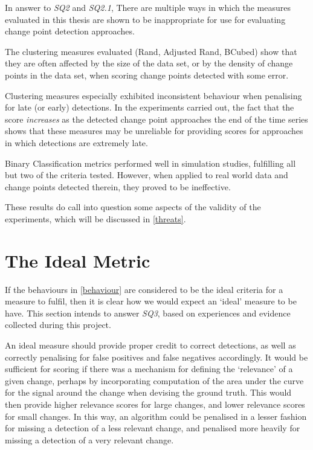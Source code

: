 \documentclass{uvamscse}	%
\begin{document}
In answer to \emph{SQ2} and \emph{SQ2.1},  There are multiple ways in which the measures evaluated in this thesis are shown to be inappropriate for use for evaluating change point detection approaches.

The clustering measures evaluated (Rand, Adjusted Rand, BCubed) show that they are often affected by the size of the data set, or by the density of change points in the data set, when scoring change points detected with some error.

Clustering measures especially exhibited inconsistent behaviour when penalising for late (or early) detections. In the experiments carried out, the fact that the score \emph{increases} as the detected change point approaches the end of the time series shows that these measures may be unreliable for providing scores for approaches in which detections are extremely late.

Binary Classification metrics performed well in simulation studies, fulfilling all but two of the criteria tested. However, when applied to real world data and change points detected therein, they proved to be ineffective.

These results do call into question some aspects of the validity of the experiments, which will be discussed in \autoref{threats}.

\section{The Ideal Metric}
\label{ideal metric}

If the behaviours in \autoref{behaviour} are considered to be the ideal criteria for a measure to fulfil, then it is clear how we would expect an `ideal' measure to be have. This section intends to answer \emph{SQ3}, based on experiences and evidence collected during this project.

An ideal measure should provide proper credit to correct detections, as well as correctly penalising for false positives and false negatives accordingly. It would be sufficient for scoring if there was a mechanism for defining the `relevance' of a given change, perhaps by incorporating computation of the area under the curve for the signal around the change when devising the ground truth. This would then provide higher relevance scores for large changes, and lower relevance scores for small changes. In this way, an algorithm could be penalised in a lesser fashion for missing a detection of a less relevant change, and penalised more heavily for missing a detection of a very relevant change.
\end{document}

